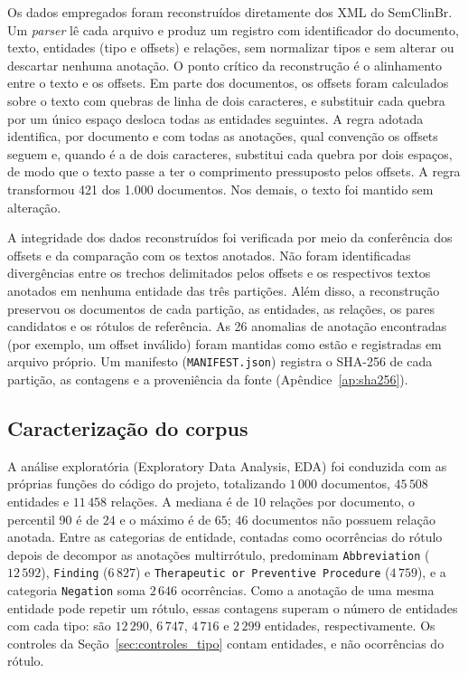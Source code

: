 Os dados empregados foram reconstruídos diretamente dos XML do SemClinBr. Um
\emph{parser} lê cada arquivo e produz um registro com identificador do documento,
texto, entidades (tipo e offsets) e relações, sem normalizar tipos e sem alterar ou
descartar nenhuma anotação. O ponto crítico da reconstrução é o alinhamento entre o
texto e os offsets. Em parte dos documentos, os offsets foram calculados sobre o texto
com quebras de linha de dois caracteres, e substituir cada quebra por um único espaço
desloca todas as entidades seguintes. A regra adotada identifica, por documento e com
todas as anotações, qual convenção os offsets seguem e, quando é a de dois caracteres,
substitui cada quebra por dois espaços, de modo que o texto passe a ter o comprimento
pressuposto pelos offsets. A regra transformou 421 dos 1.000 documentos. Nos demais, o
texto foi mantido sem alteração.

A integridade dos dados reconstruídos foi verificada por meio da conferência dos offsets e da comparação com os textos anotados. Não foram identificadas divergências entre os trechos delimitados pelos offsets e os respectivos textos anotados em nenhuma entidade das três partições. Além disso, a reconstrução preservou os documentos de cada partição, as entidades, as relações, os pares candidatos e os rótulos de referência. As 26 anomalias de anotação encontradas
(por exemplo, um offset inválido) foram mantidas como estão e registradas em arquivo
próprio. Um manifesto (\texttt{MANIFEST.json}) registra o SHA-256 de cada partição,
as contagens e a proveniência da fonte (Apêndice~\ref{ap:sha256}).

\subsection{Caracterização do corpus}
\label{sec:eda}

A análise exploratória (\foreignlanguage{english}{Exploratory Data Analysis}, EDA)
foi conduzida com as próprias funções do código do projeto, totalizando $1\,000$
documentos, $45\,508$ entidades e $11\,458$ relações. A mediana é de $10$ relações por
documento, o percentil 90 é de $24$ e o máximo é de $65$; $46$ documentos não possuem
relação anotada. Entre as categorias de entidade, contadas como ocorrências do
rótulo depois de decompor as anotações multirrótulo, predominam
\texttt{Abbreviation} ($12\,592$), \texttt{Finding} ($6\,827$) e
\texttt{Therapeutic or Preventive Procedure} ($4\,759$), e a categoria
\texttt{Negation} soma $2\,646$ ocorrências. Como a anotação de uma mesma entidade
pode repetir um rótulo, essas contagens superam o número de entidades com cada tipo:
são $12\,290$, $6\,747$, $4\,716$ e $2\,299$ entidades, respectivamente. Os
controles da Seção~\ref{sec:controles_tipo} contam entidades, e não ocorrências do
rótulo.

